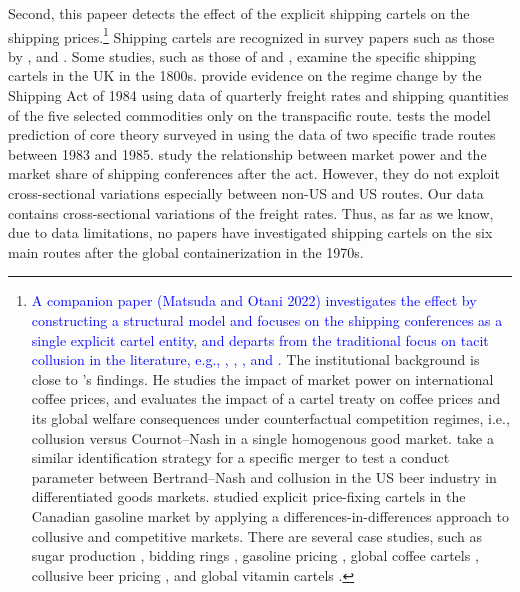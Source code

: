 \documentclass[11pt]{article}
\begin{document}
Second, this papeer detects the effect of the explicit shipping cartels on the shipping prices.\footnote{\textcolor{blue}{A companion paper (Matsuda and Otani 2022) investigates the effect by constructing a structural model and focuses on the shipping conferences as a single explicit cartel entity, and departs from the traditional focus on tacit collusion in the literature, e.g., \cite{porter1983study}, \cite{bresnahan1987competition}, \cite{miller2017understanding}, and \cite{byrne2019learning}.} The institutional background is close to \cite{igami2015market}'s findings. He studies the impact of market power on international coffee prices, and evaluates the impact of a cartel treaty on coffee prices and its global welfare consequences under counterfactual competition regimes, i.e., collusion versus Cournot–Nash in a single homogenous good market. \cite{miller2017understanding} take a similar identification strategy for a specific merger to test a conduct parameter between Bertrand–Nash and collusion in the US beer industry in differentiated goods markets. \cite{clark2013collusion,clark2014effect} studied explicit price-fixing cartels in the Canadian gasoline market by applying a differences-in-differences approach to collusive and competitive markets. There are several case studies, such as sugar production \citep{genesove1998testing,genesove2001rules}, bidding rings \citep{asker2010study}, gasoline pricing \citep{clark2013collusion,clark2014effect}, global coffee cartels \citep{igami2015market}, collusive beer pricing \citep{miller2017understanding}, and global vitamin cartels \citep{igami2021measuring}.} Shipping cartels are recognized in survey papers such as those by \cite{levenstein2006determines}, and \cite{asker2021}. Some studies, such as those of \cite{morton1997entry} and \cite{podolny1999social}, examine the specific shipping cartels in the UK in the 1800s. \cite{wilson1991some} provide evidence on the regime change by the Shipping Act of 1984 using data of quarterly freight rates and shipping quantities of the five selected commodities only on the transpacific route. \cite{pirrong1992application} tests the model prediction of core theory surveyed in \cite{sjostrom2013competition} using the data of two specific trade routes between 1983 and 1985. \cite{clyde1998market} study the relationship between market power and the market share of shipping conferences after the act. However, they do not exploit cross-sectional variations especially between non-US and US routes. Our data contains cross-sectional variations of the freight rates. Thus, as far as we know, due to data limitations, no papers have investigated shipping cartels on the six main routes after the global containerization in the 1970s.
\end{document}
